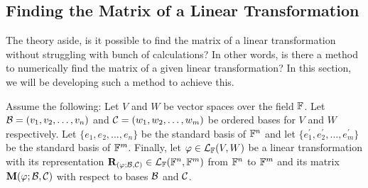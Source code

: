 \subsection{Finding the Matrix of a Linear Transformation}

The theory aside, is it possible to find the matrix of a linear transformation
without struggling with bunch of calculations? In other words, is there a
method to numerically find the matrix of a given linear transformation?
In this section, we will be developing such a method to achieve this.

Assume the following: Let $V$ and $W$ be vector spaces over the field $\mathbb{F}$.
Let $\mathcal{B} = (v_{1}, v_{2}, \dots, v_{n})$ and $\mathcal{C} = (w_{1}, w_{2}, \dots, w_{m})$
be ordered bases for $V$ and $W$ respectively. Let
$\{e_{1}, e_{2}, \dots, e_{n}\}$ be the standard basis of $\mathbb{F}^n$ and let
$\{e_{1}^{\prime}, e_{2}^{\prime}, \dots, e_{m}^{\prime}\}$ be the standard
basis of $\mathbb{F}^m$. Finally, let $\varphi \in \mathcal{L}_{\mathbb{F}}(V, W)$ be a linear
transformation with its representation $\mathbf{R}_{(\varphi; \mathcal{B}, \mathcal{C})} \in \mathcal{L}_{\mathbb{F}}(\mathbb{F}^{n}, \mathbb{F}^{m})$
from $\mathbb{F}^{n}$ to $\mathbb{F}^{m}$ and its matrix $\mathbf{M}(\varphi; \mathcal{B}, \mathcal{C})$ with respect to
bases $\mathcal{B}$ and $\mathcal{C}$.

